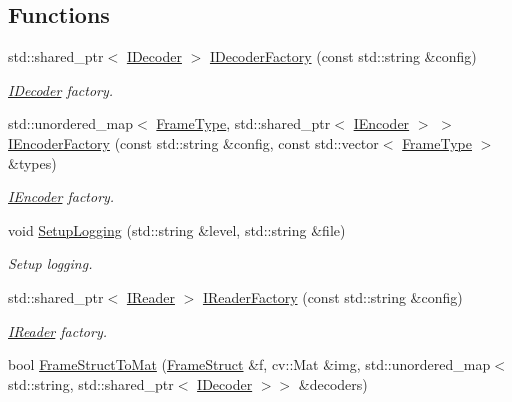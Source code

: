 \subsection*{Functions}
\begin{DoxyCompactItemize}
\item 
std\+::shared\+\_\+ptr$<$ \hyperlink{classmoetsi_1_1ssp_1_1IDecoder}{I\+Decoder} $>$ \hyperlink{namespacemoetsi_1_1ssp_a9478a722eaeec487c7288ed18c9a06bc}{I\+Decoder\+Factory} (const std\+::string \&config)
\begin{DoxyCompactList}\small\item\em \hyperlink{classmoetsi_1_1ssp_1_1IDecoder}{I\+Decoder} factory. \end{DoxyCompactList}\item 
std\+::unordered\+\_\+map$<$ \hyperlink{namespacemoetsi_1_1ssp_a46efdfa2cd5a28ead465dcc8006b5a87}{Frame\+Type}, std\+::shared\+\_\+ptr$<$ \hyperlink{classmoetsi_1_1ssp_1_1IEncoder}{I\+Encoder} $>$ $>$ \hyperlink{namespacemoetsi_1_1ssp_ad7a44286de625366acc78a320113e09b}{I\+Encoder\+Factory} (const std\+::string \&config, const std\+::vector$<$ \hyperlink{namespacemoetsi_1_1ssp_a46efdfa2cd5a28ead465dcc8006b5a87}{Frame\+Type} $>$ \&types)
\begin{DoxyCompactList}\small\item\em \hyperlink{classmoetsi_1_1ssp_1_1IEncoder}{I\+Encoder} factory. \end{DoxyCompactList}\item 
void \hyperlink{namespacemoetsi_1_1ssp_a0af356ab87e92f92c49e7118b9cb1ba2}{Setup\+Logging} (std\+::string \&level, std\+::string \&file)
\begin{DoxyCompactList}\small\item\em Setup logging. \end{DoxyCompactList}\item 
std\+::shared\+\_\+ptr$<$ \hyperlink{classmoetsi_1_1ssp_1_1IReader}{I\+Reader} $>$ \hyperlink{namespacemoetsi_1_1ssp_ad5e820c4c6a1a43d5e85608a06b86ea8}{I\+Reader\+Factory} (const std\+::string \&config)
\begin{DoxyCompactList}\small\item\em \hyperlink{classmoetsi_1_1ssp_1_1IReader}{I\+Reader} factory. \end{DoxyCompactList}\item 
bool \hyperlink{namespacemoetsi_1_1ssp_ac87377cef5da79f1a9cf7a4acdc42af6}{Frame\+Struct\+To\+Mat} (\hyperlink{structmoetsi_1_1ssp_1_1FrameStruct}{Frame\+Struct} \&f, cv\+::\+Mat \&img, std\+::unordered\+\_\+map$<$ std\+::string, std\+::shared\+\_\+ptr$<$ \hyperlink{classmoetsi_1_1ssp_1_1IDecoder}{I\+Decoder} $>$$>$ \&decoders)
$$
\end{DoxyCompactItemize}
